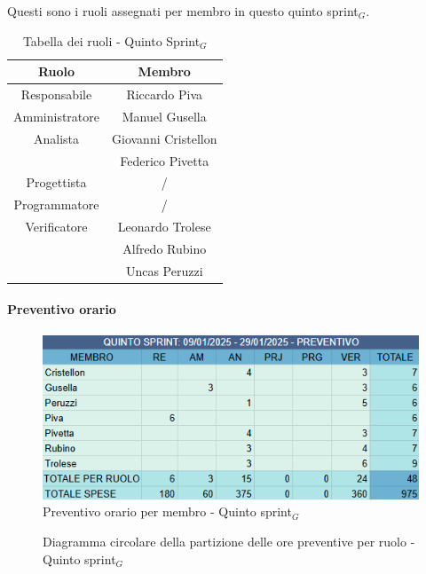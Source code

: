 \documentclass[10pt]{article}
\begin{document}
{{{{{{    Questi sono i ruoli assegnati per membro in questo quinto sprint$_G$.\\
    \begin{table}[H]
        \centering
        \begin{tabular}{|c|c|}
        \hline
        \rowcolor{gray!25}
        \textbf{Ruolo} & \textbf{Membro}\\
        \hline
        Responsabile & Riccardo Piva\\
        \hline
        Amministratore & Manuel Gusella \\ 
        \hline
        Analista & Giovanni Cristellon \\
        & Federico Pivetta \\
        \hline
        Progettista & / \\
        \hline
        Programmatore & / \\
        \hline
        Verificatore & Leonardo Trolese \\
        & Alfredo Rubino \\
        & Uncas Peruzzi \\
        \hline
        \end{tabular}
        \caption{Tabella dei ruoli - Quinto Sprint$_G$}
    \end{table}

    \paragraph{Preventivo orario}\mbox{}\vspace{0.4em}
    \begin{figure}[H]
    	\centering
    	\includegraphics[width=0.6\linewidth]{preventivoOreQuintoSprint.PNG}
    	\caption{Preventivo orario per membro - Quinto sprint$_G$}
    	\label{fig:Preventivo orario per membro - Quinto sprint$_G$}
    \end{figure}

    \begin{figure}[H]
        \centering
        \caption{Diagramma circolare della partizione delle ore preventive per ruolo - Quinto sprint$_G$ }
        \label{fig:Diagramma circolare della partizione delle ore preventive per ruolo - Quinto sprint$_G$}
    \end{figure}
    
}}}}}}
\end{document}
